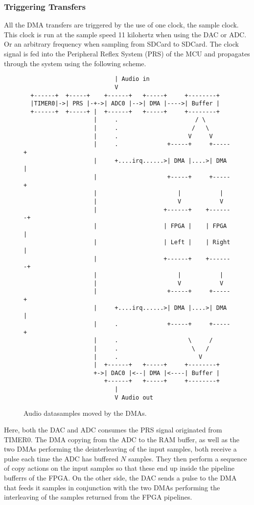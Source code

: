 
\subsubsection{Triggering Transfers}

All the DMA transfers are triggered by the use of one clock, the sample clock.
This clock is run at the sample speed 11 kilohertz when using the DAC or ADC. Or
an arbitrary frequency when sampling from SDCard to SDCard. The clock signal is fed into
the Peripheral Reflex System  (PRS) of the MCU and propagates
through the system using the following scheme.

\begin{figure}[H]
  \begin{verbatim}
                          | Audio in
                          V
  +------+  +-----+    +------+   +-----+     +--------+
  |TIMER0|->| PRS |-+->| ADC0 |-->| DMA |---->| Buffer |
  +------+  +-----+ |  +------+   +-----+     +--------+
                    |     .                      / \
                    |     .                     /   \
                    |     .                    V     V
                    |     .              +-----+     +-----+
                    |     +....irq......>| DMA |....>| DMA |
                    |                    +-----+     +-----+
                    |                       |           |
                    |                       V           V
                    |                   +------+    +-------+
                    |                   | FPGA |    | FPGA  |
                    |                   | Left |    | Right |
                    |                   +------+    +-------+
                    |                       |           |
                    |                       V           V
                    |                    +-----+     +-----+
                    |     +....irq......>| DMA |....>| DMA |
                    |     .              +-----+     +-----+
                    |     .                    \     /
                    |     .                     \   /
                    |     .                       V
                    |  +------+   +-----+     +--------+
                    +->| DAC0 |<--| DMA |<----| Buffer |
                       +------+   +-----+     +--------+
                          |
                          V Audio out
  \end{verbatim}
  \caption{Audio datasamples moved by the DMAs.}
  \label{mcu:dma-dataflow}
\end{figure}

Here, both the DAC and ADC consumes the PRS signal originated from TIMER0. The
DMA copying from the ADC to the RAM buffer, as well as the two DMAs performing the
deinterleaving of the input samples, both receive a pulse each time the ADC has
buffered $N$ samples. They then perform a sequence of copy actions on the input
samples so that these end up inside the pipeline bufferrs of the FPGA. On the
other side, the DAC sends a pulse to the DMA that feeds it samples in conjunction
with the two DMAs performing the interleaving of the samples returned from the
FPGA pipelines.
